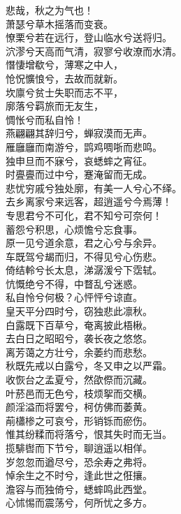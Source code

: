 \documentclass[]{article}
\begin{document}
悲哉，秋之为气也！\\
萧瑟兮草木摇落而变衰。\\
憭栗兮若在远行，登山临水兮送将归。\\
泬漻兮天高而气清，寂寥兮收潦而水清。\\
憯悽增欷兮，薄寒之中人，\\
怆怳懭悢兮，去故而就新。\\
坎廪兮贫士失职而志不平，\\
廓落兮羁旅而无友生，\\
惆怅兮而私自怜！\\
燕翩翩其辞归兮，蝉寂漠而无声。\\
雁廱廱而南游兮，鹍鸡啁哳而悲鸣。\\
独申旦而不寐兮，哀蟋蟀之宵征。\\
时亹亹而过中兮，蹇淹留而无成。\\
悲忧穷戚兮独处廓，有美一人兮心不绎。\\
去乡离家兮来远客，超逍遥兮今焉薄！\\
专思君兮不可化，君不知兮可奈何！\\
蓄怨兮积思，心烦憺兮忘食事。\\
原一见兮道余意，君之心兮与余异。\\
车既驾兮朅而归，不得见兮心伤悲。\\
倚结軨兮长太息，涕潺湲兮下霑轼。\\
忼慨绝兮不得，中瞀乱兮迷惑。\\
私自怜兮何极？心怦怦兮谅直。\\
皇天平分四时兮，窃独悲此凛秋。\\
白露既下百草兮，奄离披此梧楸。\\
去白日之昭昭兮，袭长夜之悠悠。\\
离芳蔼之方壮兮，余萎约而悲愁。\\
秋既先戒以白露兮，冬又申之以严霜。\\
收恢台之孟夏兮，然欿傺而沉藏。\\
叶菸邑而无色兮，枝烦挐而交横。\\
颜淫溢而将罢兮，柯仿佛而萎黄。\\
萷櫹椮之可哀兮，形销铄而瘀伤。\\
惟其纷糅而将落兮，恨其失时而无当。\\
揽騑辔而下节兮，聊逍遥以相佯。\\
岁忽忽而遒尽兮，恐余寿之弗将。\\
悼余生之不时兮，逢此世之俇攘。\\
澹容与而独倚兮，蟋蟀鸣此西堂。\\
心怵惕而震荡兮，何所忧之多方。\\
\end{document}
